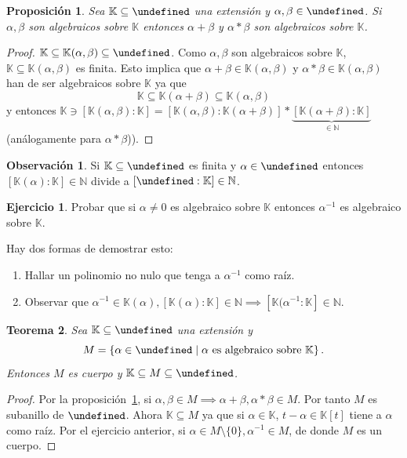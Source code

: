 \documentclass[10pt, spanish]{report}
\newtheorem{tma}{Teorema}[chapter]
\newtheorem{prop}[tma]{Proposición}
\theoremstyle{definition}
\newtheorem*{ejer}{Ejercicio}
\newtheorem*{obs}{Observación}
\newcommand{\N}{\mathbb{N}}
\newcommand{\K}{\mathbb{K}}
\let\L\undefined
\newcommand{\L}{\mathbb{L}}
\begin{document}
\begin{prop}\label{prop:operacionesalgebraicos}
    Sea $\K\subseteq\L$ una extensión y $\alpha,\beta\in\L$. Si $\alpha,\beta$
    son algebraicos sobre $\K$ entonces $\alpha+\beta$ y $\alpha*\beta$ son
    algebraicos sobre $\K$.
\end{prop}

\begin{proof}
    $\K\subseteq\K(\alpha,\beta)\subseteq\L$. Como $\alpha,\beta$ son
    algebraicos sobre $\K$, $\K\subseteq\K(\alpha,\beta)$ es finita. Esto
    implica que $\alpha+\beta\in\K(\alpha,\beta)$ y $\alpha*\beta\in
    \K(\alpha,\beta)$ han de ser algebraicos sobre $\K$ ya que
    \[\K\subseteq\K(\alpha+\beta)\subseteq\K(\alpha,\beta)\]
    y entonces $\K\ni[\K(\alpha,\beta):\K]=[\K(\alpha,\beta):\K(\alpha+\beta)]*
    \underbrace{[\K(\alpha+\beta):\K]}_{\in \N}$ (análogamente para
    $\alpha*\beta$)).
\end{proof}

\begin{obs}
    Si $\K\subseteq\L$ es finita y $\alpha\in\L$ entonces $[\K(\alpha):\K]\in
    \N$ divide a $[\L:\K]\in\N$.
\end{obs}

\begin{ejer}
    Probar que si $\alpha\neq 0$ es algebraico sobre $\K$ entonces $\alpha^{-1}$
    es algebraico sobre $\K$.
\end{ejer}

Hay dos formas de demostrar esto:
\begin{enumerate}
    \item Hallar un polinomio no nulo que tenga a $\alpha^{-1}$ como raíz.
    \item Observar que $\alpha^{-1}\in \K(\alpha),[\K(\alpha):\K]\in\N\implies
        [\K(\alpha^{-1}:\K]\in\N$.
\end{enumerate}

\begin{tma}\label{tma:extensionintermedia}
    Sea $\K\subseteq\L$ una extensión y \[M=\left\{ \alpha\in\L\mid\alpha\text{ es
    algebraico sobre }\K \right\}.\]
    Entonces $M$ es cuerpo y $\K\subseteq M\subseteq\L$.
\end{tma}

\begin{proof}
    Por la proposición~\ref{prop:operacionesalgebraicos}, si $\alpha,\beta\in
    M\implies\alpha+\beta,\alpha*\beta\in M$. Por tanto $M$ es subanillo de
    $\L$. Ahora $\K\subseteq M$ ya que si $\alpha\in\K$, $t-\alpha\in\K[t]$
    tiene a $\alpha$ como raíz. Por el ejercicio anterior, si $\alpha\in
    M\setminus\{0\}, \alpha^{-1}\in M$, de donde $M$ es un cuerpo.
\end{proof}
\end{document}
